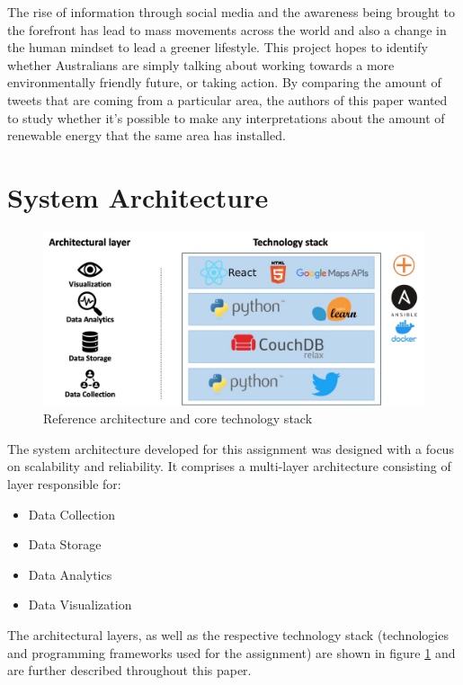 \documentclass[11pt, oneside]{article}
\newenvironment{myitemize}
{ \begin{itemize}
    \setlength{\itemsep}{1pt}
    \setlength{\parskip}{1pt}
    \setlength{\parsep}{1pt}     }
{ \end{itemize}                  }
\begin{document}
\newline
The rise of information through social media and the awareness being brought to the forefront has lead to mass movements across the world and also a change in the human mindset to lead a greener lifestyle.
\newline
\newline
This project hopes to identify whether Australians are simply talking about working towards a more environmentally friendly future, or taking action. By comparing the amount of tweets that are coming from a particular area, the authors of this paper wanted to study whether it's possible to make any interpretations about the amount of renewable energy that the same area has installed.

\section{System Architecture}
\label{sec:system_architecture}
\begin{figure}
\begin{center}
    \includegraphics[width=0.8\linewidth]{figures/fig_system_design.png}  
\end{center}
  \caption{Reference architecture and core technology stack}
  \label{fig:system_design}
\end{figure}
The system architecture developed for this assignment was designed with a focus on scalability and reliability. It comprises a multi-layer architecture consisting of layer responsible for: 
\begin{myitemize}
    \item Data Collection
    \item Data Storage
    \item Data Analytics
    \item Data Visualization
\end{myitemize}
The architectural layers, as well as the respective technology stack (technologies and programming frameworks used for the assignment) are shown in figure \ref{fig:system_design} and are further described throughout this paper.
\end{document}
